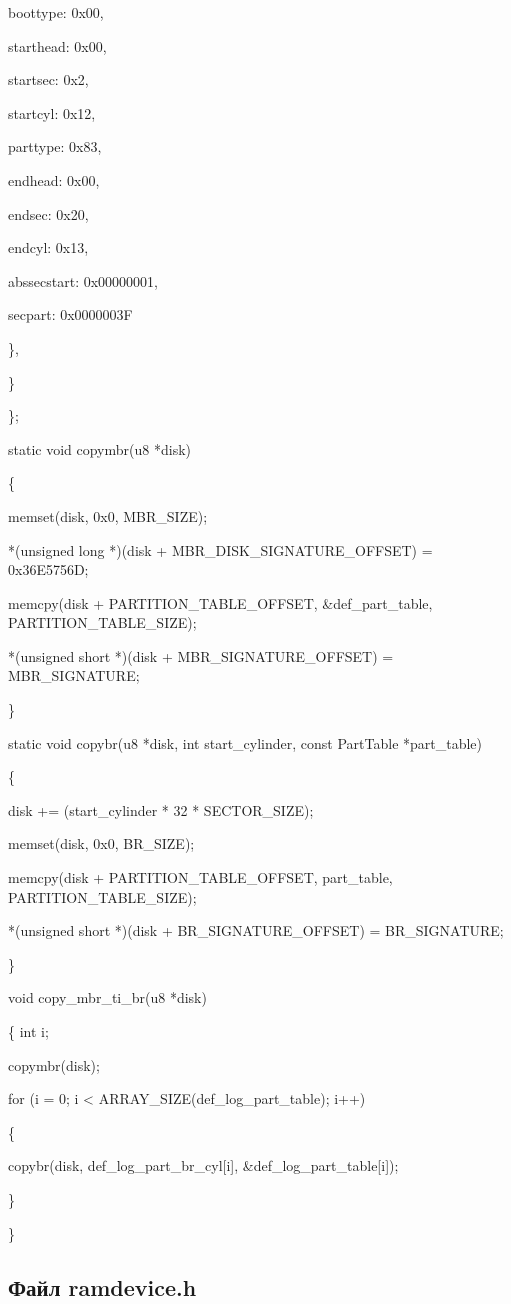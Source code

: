 \documentclass[11pt]{article}
\begin{document}
			boottype: 0x00,
			
			starthead: 0x00,
			
			startsec: 0x2,
			
			startcyl: 0x12,
			
			parttype: 0x83,
			
			endhead: 0x00,
			
			endsec: 0x20,
			
			endcyl: 0x13,
			
			abssecstart: 0x00000001,
			
			secpart: 0x0000003F
			
		\},
		
	\}
	
\};


static void copymbr(u8 *disk)

\{

	memset(disk, 0x0, MBR\_SIZE);
	
	*(unsigned long *)(disk + MBR\_DISK\_SIGNATURE\_OFFSET) = 0x36E5756D;
	
	memcpy(disk + PARTITION\_TABLE\_OFFSET, &def\_part\_table, PARTITION\_TABLE\_SIZE);
	
	*(unsigned short *)(disk + MBR\_SIGNATURE\_OFFSET) = MBR\_SIGNATURE;
	
\}

static void copybr(u8 *disk, int start\_cylinder, const PartTable *part\_table)

\{

	disk += (start\_cylinder * 32  * SECTOR\_SIZE);
	
	memset(disk, 0x0, BR\_SIZE);
	
	memcpy(disk + PARTITION\_TABLE\_OFFSET, part\_table,
		PARTITION\_TABLE\_SIZE);
		
	*(unsigned short *)(disk + BR\_SIGNATURE\_OFFSET) = BR\_SIGNATURE;
	
\}

void copy\_mbr\_ti\_br(u8 *disk)

\{
	int i;

	copymbr(disk);
	
	for (i = 0; i < ARRAY\_SIZE(def\_log\_part\_table); i++)
	
	\{
	
		copybr(disk, def\_log\_part\_br\_cyl[i], &def\_log\_part\_table[i]);
		
	\}
	
\}

\subsection{Файл ramdevice.h}
\end{document}
